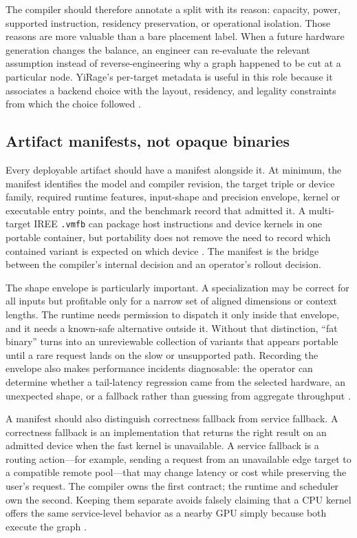 The compiler should therefore annotate a split with its reason: capacity, power, supported instruction, residency preservation, or operational isolation. Those reasons are more valuable than a bare placement label. When a future hardware generation changes the balance, an engineer can re-evaluate the relevant assumption instead of reverse-engineering why a graph happened to be cut at a particular node. YiRage's per-target metadata is useful in this role because it associates a backend choice with the layout, residency, and legality constraints from which the choice followed \citep{yirage2026}.

\subsection{Artifact manifests, not opaque binaries}

Every deployable artifact should have a manifest alongside it. At minimum, the manifest identifies the model and compiler revision, the target triple or device family, required runtime features, input-shape and precision envelope, kernel or executable entry points, and the benchmark record that admitted it. A multi-target IREE \texttt{.vmfb} can package host instructions and device kernels in one portable container, but portability does not remove the need to record which contained variant is expected on which device \citep{iree2024}. The manifest is the bridge between the compiler's internal decision and an operator's rollout decision.

The shape envelope is particularly important. A specialization may be correct for all inputs but profitable only for a narrow set of aligned dimensions or context lengths. The runtime needs permission to dispatch it only inside that envelope, and it needs a known-safe alternative outside it. Without that distinction, ``fat binary'' turns into an unreviewable collection of variants that appears portable until a rare request lands on the slow or unsupported path. Recording the envelope also makes performance incidents diagnosable: the operator can determine whether a tail-latency regression came from the selected hardware, an unexpected shape, or a fallback rather than guessing from aggregate throughput \citep{iree2024,memoryfloor2026}.

A manifest should also distinguish correctness fallback from service fallback. A correctness fallback is an implementation that returns the right result on an admitted device when the fast kernel is unavailable. A service fallback is a routing action---for example, sending a request from an unavailable edge target to a compatible remote pool---that may change latency or cost while preserving the user's request. The compiler owns the first contract; the runtime and scheduler own the second. Keeping them separate avoids falsely claiming that a CPU kernel offers the same service-level behavior as a nearby GPU simply because both execute the graph \citep{patel2025llminference,iree2024}.

